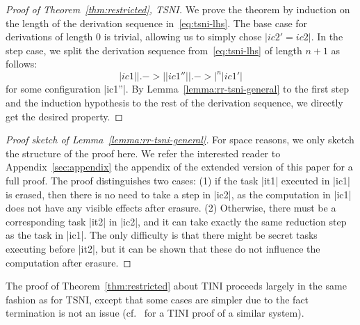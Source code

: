 \begin{proof}[Proof of Theorem~\ref{thm:restricted}, TSNI]
  We prove the theorem by induction on the length of the derivation sequence in~\eqref{eq:tsni-lhs}.
  The base case for derivations
  of length 0 is trivial, allowing
  us to simply chose $|ic2'=ic2|$.  In the step case,
  we split the derivation sequence from~\eqref{eq:tsni-lhs} of length $n+1$ as follows:
  \[
  |ic1| |.->| |ic1''| |.->|^n |ic1'|
  \]
  for some configuration |ic1''|.  By Lemma~\ref{lemma:rr-tsni-general} to
  the first step and
  the induction hypothesis to the rest of the derivation sequence,
  we directly get the desired property.
\end{proof}
\begin{proof}[Proof sketch of Lemma~\ref{lemma:rr-tsni-general}]
  For space reasons, we only sketch the structure of the proof here.
  We refer the interested reader to
  \ifextended
  Appendix~\ref{sec:appendix}
  \else
  the appendix of the extended version of this paper
  \fi
  for a full proof.
  The proof distinguishes two cases: (1) if the task |it1| executed in |ic1| is erased, then there is no
    need to take a step in |ic2|, as the computation in |ic1| does
    not have any visible effects after erasure.
    (2) Otherwise, there must be a corresponding task |it2| in |ic2|, and
    it can take exactly the same reduction step as the task in |ic1|.
    The only difficulty is that there might be secret tasks executing
    before |it2|, but it can be shown that these do not influence the
    computation after erasure.
\end{proof}
The proof of Theorem~\ref{thm:restricted} about TINI proceeds largely
in the same fashion as for TSNI, except that
some cases are simpler due to the fact termination is not an issue
(cf.~\cite{lio} for a TINI proof of a similar system).
